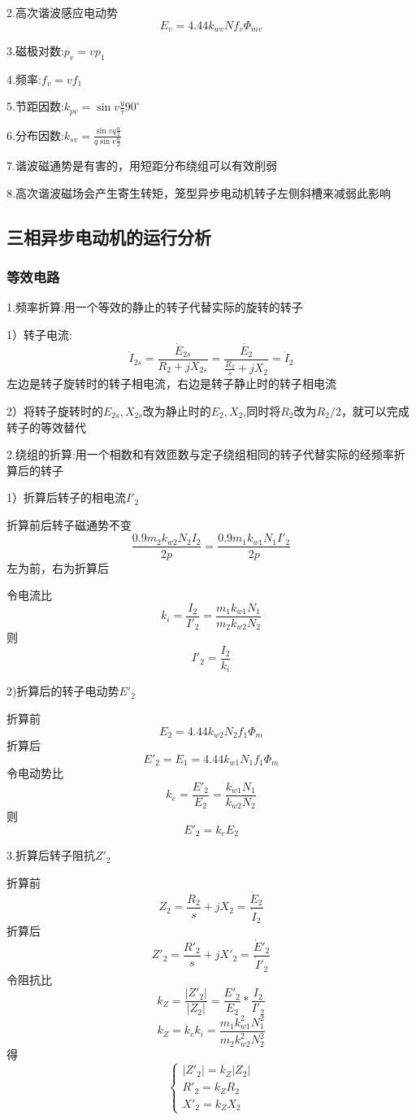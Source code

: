 \documentclass[11pt,twoside,a4paper]{ctexart}
\begin{document}
2.高次谐波感应电动势
\[E_v = 4.44k_{wv}Nf_v\varPhi _{mv}\]

3.磁极对数:$p_v = vp_1$

4.频率:$f_v = vf_1$

5.节距因数:$k_{pv} = \sin v\frac{y}{\tau }90^\circ $

6.分布因数:$k_{sv} = \frac{\sin vq\frac{\alpha}{2}}{q\sin v\frac{\alpha}{2}} $

7.谐波磁通势是有害的，用短距分布绕组可以有效削弱

8.高次谐波磁场会产生寄生转矩，笼型异步电动机转子左侧斜槽来减弱此影响

\subsection{三相异步电动机的运行分析}
\subsubsection{等效电路}

1.频率折算:用一个等效的静止的转子代替实际的旋转的转子

1）转子电流:
\[\dot{I}_{2s} = \frac{\dot{E}_{2s}}{R_2 + jX_{2s}} = \frac{\dot{E_2}}{\frac{R_2}{s} + jX_2} = \dot{I}_2\]
左边是转子旋转时的转子相电流，右边是转子静止时的转子相电流

2）将转子旋转时的$E_{2s},X_{2s}$改为静止时的$E_2,X_2$,同时将$R_2$改为$R_2/2$，就可以完成转子的等效替代

2.绕组的折算:用一个相数和有效匝数与定子绕组相同的转子代替实际的经频率折算后的转子

1）折算后转子的相电流$I'_2$

折算前后转子磁通势不变
\[\frac{0.9m_2k_{w2}N_2I_2}{2p} = \frac{0.9m_1k_{w1}N_1I'_2}{2p}\]
左为前，右为折算后

令电流比
\[k_i = \frac{I_2}{I'_2} = \frac{m_1k_{w1}N_1}{m_2k_{w2}N_2}\]
则
\[I'_2 = \frac{I_2}{k_i}\]

2)折算后的转子电动势$E'_2$

折算前
\[E_2 = 4.44k_{w2}N_2f_1\varPhi _m\]
折算后
\[E'_2 = E_1 = 4.44k_{w1}N_1f_1\varPhi _m\]
令电动势比
\[k_e = \frac{E'_2}{E_2} = \frac{k_{w1}N_1}{k_{w2}N_2}\]
则
\[E'_2 = k_eE_2\]

3.折算后转子阻抗$Z'_2$

折算前
\[Z_2 = \frac{R_2}{s} + jX_2 = \frac{\dot{E}_2}{\dot{I}_2}\]
折算后
\[Z'_2 = \frac{R'_2}{s} + jX'_2 = \frac{\dot{E}'_2}{\dot{I}'_2}\]
令阻抗比
\[k_Z = \frac{|Z'_2|}{|Z_2|} = \frac{E'_2}{E_2}*\frac{I_2}{I'_2}\]
\[k_Z = k_ek_i = \frac{m_1k_{w1}^2N_1^2}{m_2k_{w2}^2N_2^2}\]
得
\[
\begin{cases}
|Z'_2| = k_Z|Z_2| \\
R'_2 = k_ZR_2  \\
X'_2 = k_ZX_2       
\end{cases}\]
\end{document}

